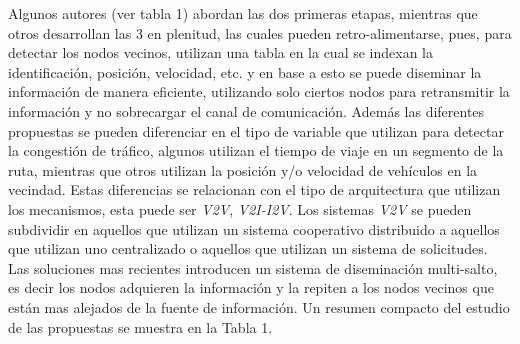 Algunos autores (ver tabla 1) abordan las dos primeras etapas, mientras que otros desarrollan las  3 en plenitud, las cuales pueden  retro-alimentarse, pues, para detectar los nodos vecinos, utilizan una tabla en la cual se indexan la identificación, posición,  velocidad, etc. y en base a esto se puede diseminar la información de manera eficiente, utilizando solo ciertos nodos para retransmitir la información y no sobrecargar el canal de comunicación.
Además las diferentes propuestas se pueden diferenciar en el tipo de variable que utilizan para detectar la congestión de tráfico, algunos utilizan el tiempo de viaje en un segmento de la ruta, mientras que otros utilizan la posición y/o velocidad de vehículos en la vecindad. Estas diferencias se relacionan  con el tipo de arquitectura que utilizan los mecanismos, esta puede ser \textit{V2V}, \textit{V2I-I2V}.
Los sistemas \textit{V2V} se pueden subdividir en aquellos que utilizan un sistema cooperativo distribuido a aquellos que utilizan uno centralizado o aquellos que utilizan un sistema de solicitudes. Las soluciones mas recientes introducen un sistema de diseminación multi-salto, es decir los nodos adquieren la información y la repiten a los nodos vecinos que están mas alejados de la fuente de información. Un resumen compacto del estudio de las propuestas se muestra en la Tabla 1.

